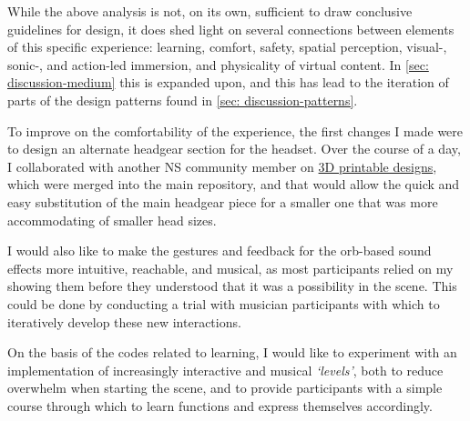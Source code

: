 While the above analysis is not, on its own, sufficient to draw conclusive guidelines for design, it does shed light on several connections between elements of this specific experience: learning, comfort, safety, spatial perception, visual-, sonic-, and action-led immersion, and physicality of virtual content. In \autoref{sec: discussion-medium} this is expanded upon, and this has lead to the iteration of parts of the design patterns found in \autoref{sec: discussion-patterns}.

To improve on the comfortability of the experience, the first changes I made were to design an alternate headgear section for the headset. Over the course of a day, I collaborated with another NS community member on \href{https://github.com/AheadIO/Deck-X/tree/main/Deck_X/STL_files/Headgear/Welding_Headgear_Adaptor}{3D printable designs}, which were merged into the main repository, and that would allow the quick and easy substitution of the main headgear piece for a smaller one that was more accommodating of smaller head sizes.

I would also like to make the gestures and feedback for the orb-based sound effects more intuitive, reachable, and musical, as most participants relied on my showing them before they understood that it was a possibility in the scene. This could be done by conducting a trial with musician participants with which to iteratively develop these new interactions. 

On the basis of the codes related to learning, I would like to experiment with an implementation of increasingly interactive and musical \textit{`levels'}, both to reduce overwhelm when starting the scene, and to provide participants with a simple course through which to learn functions and express themselves accordingly.